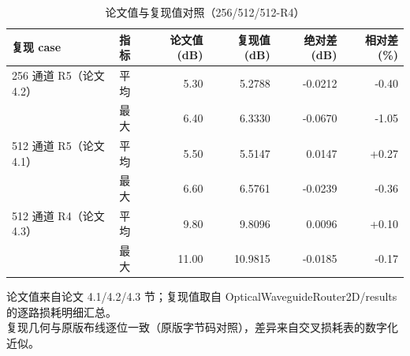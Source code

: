 \begin{table}[htbp]
  \centering
  \caption{论文值与复现值对照（256/512/512-R4）}
  \label{tab:repro-compare}
  \begin{tabular}{llrrrr}
    \toprule
    复现 case & 指标 & 论文值 (dB) & 复现值 (dB) & 绝对差 (dB) & 相对差 (\%) \\
    \midrule
    256 通道 R5（论文 4.2） & 平均 & 5.30 & 5.2788 & -0.0212 & -0.40 \\
     & 最大 & 6.40 & 6.3330 & -0.0670 & -1.05 \\
    512 通道 R5（论文 4.1） & 平均 & 5.50 & 5.5147 & 0.0147 & +0.27 \\
     & 最大 & 6.60 & 6.5761 & -0.0239 & -0.36 \\
    512 通道 R4（论文 4.3） & 平均 & 9.80 & 9.8096 & 0.0096 & +0.10 \\
     & 最大 & 11.00 & 10.9815 & -0.0185 & -0.17 \\
    \bottomrule
  \end{tabular}
  \par\vspace{2pt}
  \begin{flushleft}\footnotesize
  论文值来自论文 4.1/4.2/4.3 节；复现值取自 OpticalWaveguideRouter2D/results 的逐路损耗明细汇总。 \\
  复现几何与原版布线逐位一致（原版字节码对照），差异来自交叉损耗表的数字化近似。 \\
  \end{flushleft}
\end{table}
